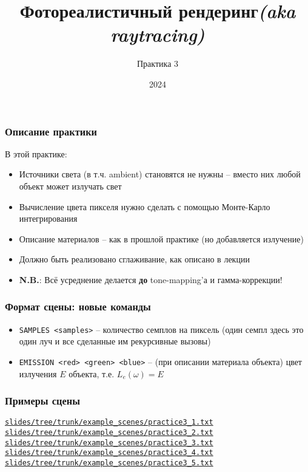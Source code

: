 \documentclass[10pt,handout]{beamer}
\title{Фотореалистичный рендеринг\quad\quad\quad\quad\quad\quad \textit{(aka raytracing)}}
\subtitle{Практика 3}
\date{2024}
\begin{document}
\frame{\titlepage}

\begin{frame}[fragile]
\frametitle{Описание практики}
В этой практике:
\begin{itemize}
\item Источники света (в т.ч. ambient) становятся не нужны -- вместо них любой объект может излучать свет
\item Вычисление цвета пикселя нужно сделать с помощью Монте-Карло интегрирования
\item Описание материалов -- как в прошлой практике (но добавляется излучение)
\item Должно быть реализовано сглаживание, как описано в лекции
\item \textbf{\alert{N.B.}}: Всё усреднение делается \textbf{до} tone-mapping'а и гамма-коррекции!
\end{itemize}
\end{frame}

\begin{frame}
\frametitle{Формат сцены: новые команды}
\begin{itemize}
\item \texttt{SAMPLES <samples>} -- количество семплов на пиксель (один семпл здесь это один луч и все сделанные им рекурсивные вызовы)
\item \texttt{EMISSION <red> <green> <blue>} -- (при описании материала объекта) цвет излучения \begin{math}E\end{math} объекта, т.е. \begin{math}L_e(\omega) = E\end{math}
\end{itemize}
\end{frame}

\begin{frame}[fragile]
\frametitle{Примеры сцены}
\href{https://github.com/lisyarus/raytracing-course-slides/tree/trunk/example_scenes/practice3_1.txt}{\texttt{slides/tree/trunk/example\_scenes/practice3\_1.txt}}
\href{https://github.com/lisyarus/raytracing-course-slides/tree/trunk/example_scenes/practice3_2.txt}{\texttt{slides/tree/trunk/example\_scenes/practice3\_2.txt}}
\href{https://github.com/lisyarus/raytracing-course-slides/tree/trunk/example_scenes/practice3_3.txt}{\texttt{slides/tree/trunk/example\_scenes/practice3\_3.txt}}
\href{https://github.com/lisyarus/raytracing-course-slides/tree/trunk/example_scenes/practice3_4.txt}{\texttt{slides/tree/trunk/example\_scenes/practice3\_4.txt}}
\href{https://github.com/lisyarus/raytracing-course-slides/tree/trunk/example_scenes/practice3_5.txt}{\texttt{slides/tree/trunk/example\_scenes/practice3\_5.txt}}
\end{frame}
\end{document}
